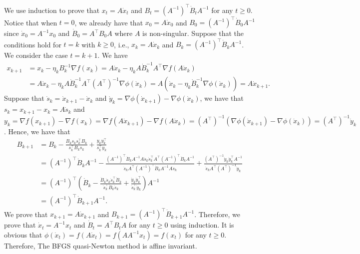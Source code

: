 \documentclass[11pt,letterpaper]{article}
\newcommand\0{{\Vector{0}}}
\newcommand\1{{\Vector{1}}}
\numberwithin{assumption}{section}
\numberwithin{definition}{section}
\numberwithin{theorem}{section}
\numberwithin{remark}{section}
\begin{document}
    We use induction to prove that $x_t = A\dot{x}_t$ and $B_t = (A^{-1})^\top \dot{B}_t A^{-1}$ for any $t \geq 0$. Notice that when $t = 0$, we already have that $x_0 = A\dot{x}_0$ and $B_0 = (A^{-1})^\top \dot{B}_0 A^{-1}$ since $\dot{x}_0 = A^{-1}x_0$ and $\dot{B}_0 = A^\top B_0 A$ where $A$ is non-singular. Suppose that the conditions hold for $t = k$ with $k \geq 0$, i.e., $x_k = A\dot{x}_k$ and $B_k = (A^{-1})^\top \dot{B}_k A^{-1}$. We consider the case $t = k + 1$. We have
    \begin{equation*}
    \begin{split}
        x_{k + 1} & = x_k - \eta_k B_k^{-1}\nabla{f(x_k)} = A\dot{x}_k - \eta_k A \dot{B}_k^{-1} A^\top \nabla{f(A\dot{x}_k)} \\
        & = A\dot{x}_k - \eta_k A \dot{B}_k^{-1} A^\top (A^\top)^{-1} \nabla{\phi(\dot{x}_k)} = A(\dot{x}_k - \eta_k \dot{B}_k^{-1} \nabla{\phi(\dot{x}_k)}) = A \dot{x}_{k + 1}.
    \end{split}
    \end{equation*}
    Suppose that $\dot{s}_k = \dot{x}_{k + 1} - \dot{x}_k$ and $\dot{y}_k = \nabla{\phi(\dot{x}_{k + 1})} - \nabla{\phi(\dot{x}_k)}$, we have that $s_k = x_{k + 1} - x_k = A\dot{s}_k$ and $y_k = \nabla{f(x_{k + 1})} - \nabla{f(x_k)} = \nabla{f(A\dot{x}_{k + 1})} - \nabla{f(A\dot{x}_k)} = (A^\top)^{-1}(\nabla{\phi(\dot{x}_{k + 1})} - \nabla{\phi(\dot{x}_k)}) = (A^\top)^{-1}\dot{y}_k$. Hence, we have that
    \begin{equation}
    \begin{split}
        B_{k + 1} & = B_k - \frac{B_k s_k s_k^\top B_k}{s_k^\top B_k s_k} + \frac{y_k y_k^\top}{s_k^\top y_k} \\
        & = (A^{-1})^\top \dot{B}_k A^{-1} - \frac{(A^{-1})^\top \dot{B}_k A^{-1} A \dot{s}_k \dot{s}_k^\top A^\top (A^{-1})^\top \dot{B}_k A^{-1}}{\dot{s}_k A^\top (A^{-1})^\top \dot{B}_k A^{-1} A \dot{s}_k} + \frac{(A^\top)^{-1}\dot{y}_k \dot{y}_k^\top A^{-1}}{\dot{s}_k A^\top (A^\top)^{-1}\dot{y}_k} \\
        & = (A^{-1})^\top \left(\dot{B}_k - \frac{\dot{B}_k \dot{s}_k \dot{s}_k^\top \dot{B}_k}{\dot{s}_k^\top \dot{B}_k \dot{s}_k} + \frac{\dot{y}_k \dot{y}_k^\top}{\dot{s}_k^\top \dot{y}_k}\right)A^{-1} \\
        & = (A^{-1})^\top \dot{B}_{k + 1} A^{-1}.
    \end{split}
    \end{equation}
    We prove that $x_{k + 1} = A\dot{x}_{k + 1}$ and $B_{k + 1} = (A^{-1})^\top \dot{B}_{k + 1} A^{-1}$. Therefore, we prove that $\dot{x}_t = A^{-1}x_t$ and $\dot{B}_t = A^\top B_t A$ for any $t \geq 0$ using induction. It is obvious that $\phi(\dot{x}_t) = f(A\dot{x}_t) = f(AA^{-1}x_t) = f(x_t)$ for any $t \geq 0$. Therefore, The BFGS quasi-Newton method is affine invariant.
\end{document}
